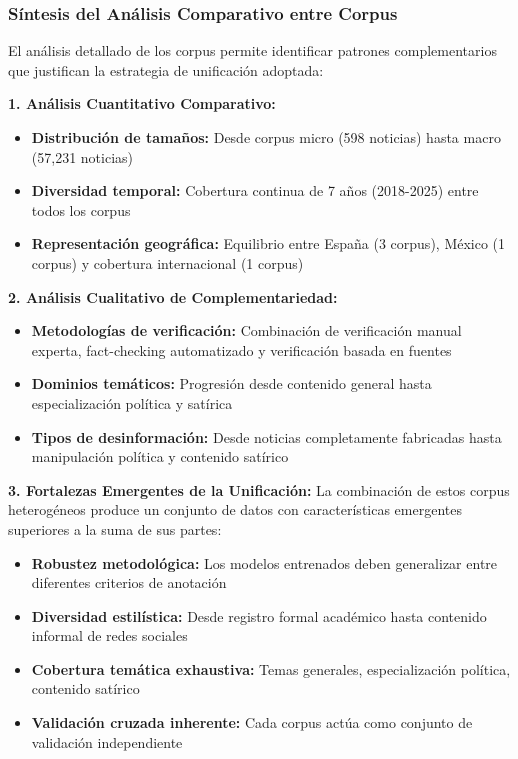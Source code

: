 \subsubsection{Síntesis del Análisis Comparativo entre Corpus}

El análisis detallado de los corpus permite identificar patrones complementarios que justifican la estrategia de unificación adoptada:

\textbf{1. Análisis Cuantitativo Comparativo:}
\begin{itemize}
    \item \textbf{Distribución de tamaños:} Desde corpus micro (598 noticias) hasta macro (57,231 noticias)
    \item \textbf{Diversidad temporal:} Cobertura continua de 7 años (2018-2025) entre todos los corpus
    \item \textbf{Representación geográfica:} Equilibrio entre España (3 corpus), México (1 corpus) y cobertura internacional (1 corpus)
\end{itemize}

\textbf{2. Análisis Cualitativo de Complementariedad:}
\begin{itemize}
    \item \textbf{Metodologías de verificación:} Combinación de verificación manual experta, fact-checking automatizado y verificación basada en fuentes
    \item \textbf{Dominios temáticos:} Progresión desde contenido general hasta especialización política y satírica
    \item \textbf{Tipos de desinformación:} Desde noticias completamente fabricadas hasta manipulación política y contenido satírico
\end{itemize}

\textbf{3. Fortalezas Emergentes de la Unificación:}
La combinación de estos corpus heterogéneos produce un conjunto de datos con características emergentes superiores a la suma de sus partes:
\begin{itemize}
    \item \textbf{Robustez metodológica:} Los modelos entrenados deben generalizar entre diferentes criterios de anotación
    \item \textbf{Diversidad estilística:} Desde registro formal académico hasta contenido informal de redes sociales
    \item \textbf{Cobertura temática exhaustiva:} Temas generales, especialización política, contenido satírico
    \item \textbf{Validación cruzada inherente:} Cada corpus actúa como conjunto de validación independiente
\end{itemize}


